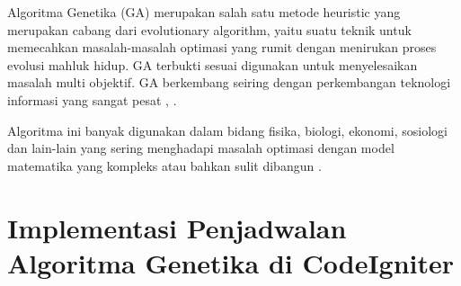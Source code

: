 Algoritma Genetika (GA) merupakan salah satu metode heuristic yang merupakan cabang dari evolutionary algorithm, yaitu suatu teknik untuk memecahkan masalah-masalah optimasi yang rumit dengan menirukan proses evolusi mahluk hidup. GA terbukti sesuai digunakan untuk menyelesaikan masalah multi objektif. GA berkembang seiring dengan perkembangan teknologi informasi yang sangat pesat \cite{liu2016mining}, \cite{wei2015genetic}.

Algoritma ini banyak digunakan dalam bidang fisika, biologi, ekonomi, sosiologi dan lain-lain yang sering menghadapi masalah optimasi dengan model matematika yang kompleks atau bahkan sulit dibangun \cite{liu2016mining}.

\section{Implementasi Penjadwalan Algoritma Genetika di CodeIgniter}